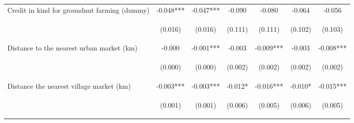 \begin{center}
\begin{tabular}{lcccccc}
Credit in kind for groundnut farming (dummy) & -0.048*** & -0.047*** & -0.090 & -0.080 & -0.064 & -0.056 \\
\vspace{4pt} & \begin{footnotesize}(0.016)\end{footnotesize} & \begin{footnotesize}(0.016)\end{footnotesize} & \begin{footnotesize}(0.111)\end{footnotesize} & \begin{footnotesize}(0.111)\end{footnotesize} & \begin{footnotesize}(0.102)\end{footnotesize} & \begin{footnotesize}(0.103)\end{footnotesize} \\
Distance to the nearest urban market (km) & -0.000 & -0.001*** & -0.003 & -0.009*** & -0.003 & -0.008*** \\
\vspace{4pt} & \begin{footnotesize}(0.000)\end{footnotesize} & \begin{footnotesize}(0.000)\end{footnotesize} & \begin{footnotesize}(0.002)\end{footnotesize} & \begin{footnotesize}(0.002)\end{footnotesize} & \begin{footnotesize}(0.002)\end{footnotesize} & \begin{footnotesize}(0.002)\end{footnotesize} \\
Distance the nearest village market (km) & -0.003*** & -0.003*** & -0.012* & -0.016*** & -0.010* & -0.015*** \\
\vspace{4pt} & \begin{footnotesize}(0.001)\end{footnotesize} & \begin{footnotesize}(0.001)\end{footnotesize} & \begin{footnotesize}(0.006)\end{footnotesize} & \begin{footnotesize}(0.005)\end{footnotesize} & \begin{footnotesize}(0.006)\end{footnotesize} & \begin{footnotesize}(0.005)\end{footnotesize} \\

\end{tabular}
\end{center}
